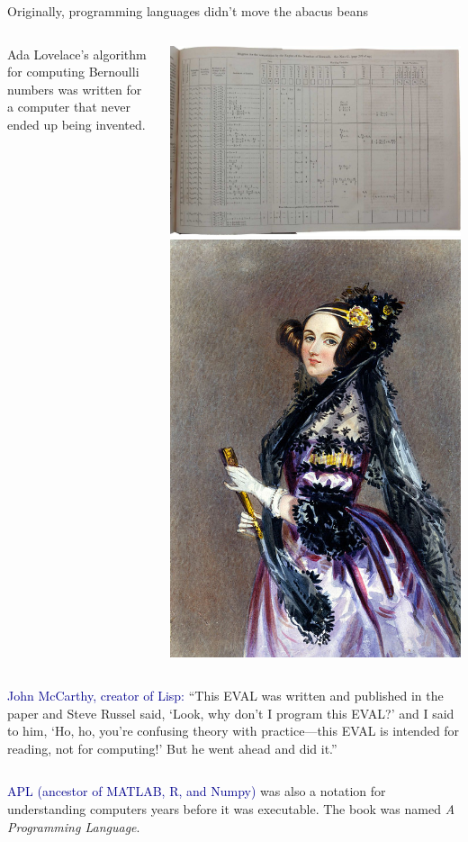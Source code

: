 \documentclass[aspectratio=169]{beamer}
\begin{document}
\begin{frame}{Originally, programming languages didn't move the abacus beans}
\vspace{0.25 cm}
\begin{columns}
Ada Lovelace's algorithm for computing Bernoulli numbers was written for a computer that never ended up being invented.

\hfill\mbox{\hspace{-1 cm}\includegraphics[height=3 cm]{ada-program.jpg}\hspace{0.5 cm}\includegraphics[height=3 cm]{ada.jpg}}
\end{columns}

\vspace{0.5 cm}
\begin{columns}
\textcolor{darkblue}{John McCarthy, creator of Lisp:} ``This EVAL was written and published in the paper and Steve Russel said, `Look, why don't I program this EVAL?' and I said to him, `Ho, ho, you're confusing theory with practice---this EVAL is intended for reading, not for computing!' But he went ahead and did it.''
\end{columns}

\vspace{0.5 cm}
\begin{columns}
\textcolor{darkblue}{APL (ancestor of MATLAB, R, and Numpy)} was also a notation for understanding computers years before it was executable. The book was named {\it A Programming Language}.
\end{columns}


\end{frame}


\end{document}
